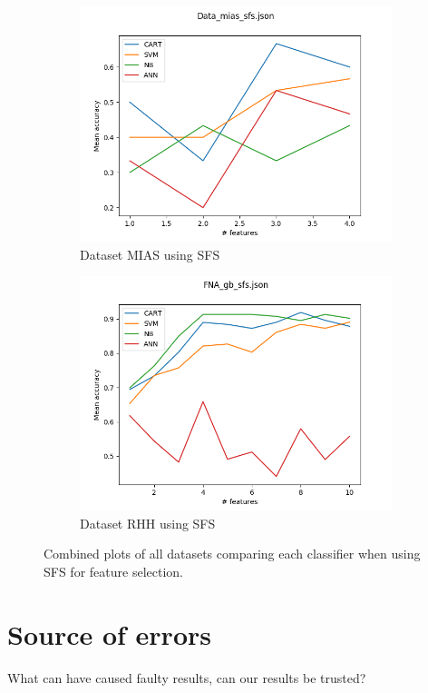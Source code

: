 \begin{figure}[htbp!]
  \begin{subfigure}[b]{0.475\textwidth}
      \centering
      \includegraphics[width=\textwidth]{../plots_1d/Data_mias_sf_combined.png}
      \caption[]%
      {{\small Dataset MIAS using SFS}}
      \label{fig:MIAS_sfs}
  \end{subfigure}
  \quad
  \begin{subfigure}[b]{0.475\textwidth}
      \centering
      \includegraphics[width=\textwidth]{../plots_1d/FNA_gb_sf_combined.png}
      \caption[]%
      {{\small Dataset RHH using SFS}}
      \label{fig:RHH_sfs}
  \end{subfigure}
  \caption[]
  {{\small Combined plots of all datasets comparing each classifier when using SFS for feature selection.}}
  \label{fig:plots_sfs}
\end{figure}

\section{Source of errors}
\label{sec:source_of_errors}

What can have caused faulty results, can our results be trusted?
